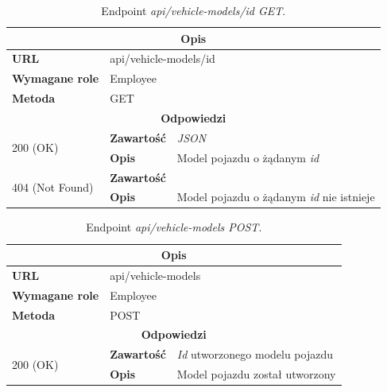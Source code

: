 \documentclass[eng,printmode,openany]{mgr}
\begin{document}
\begin{table}[H]
	\caption{Endpoint \textit{api/vehicle-models/id GET}.}
	\begin{tabularx}{\textwidth}{|l|l|X|}
		\hline
		\multicolumn{3}{|c|}{\textbf{\textbf{Opis}}}
		\\ \hline
		\textbf{URL}                         & \multicolumn{2}{l|}{api/vehicle-models/id}
		\\ \hline
		\textbf{Wymagane role}               & \multicolumn{2}{l|}{Employee}
		\\ \hline
		\textbf{Metoda}                      & \multicolumn{2}{l|}{GET}
		\\ \hline
		\multicolumn{3}{|c|}{\textbf{Odpowiedzi}}
		\\ \hline
		\multirow{2}{*}{200 (OK)} 	        & \textbf{Zawartość}   	& \textit{JSON}
		\\ \cline{2-3}                      & \textbf{Opis}         	& Model pojazdu o żądanym \textit{id}
		\\ \hline
		\multirow{2}{*}{404 (Not Found)} 	& \textbf{Zawartość}     & 
		\\ \cline{2-3}                      & \textbf{Opis}          & Model pojazdu o żądanym \textit{id} nie istnieje
		\\ \hline
	\end{tabularx}
\end{table}

\begin{table}[H]
	\caption{Endpoint \textit{api/vehicle-models POST}.}
	\begin{tabularx}{\textwidth}{|l|l|X|}
		\hline
		\multicolumn{3}{|c|}{\textbf{\textbf{Opis}}}
		\\ \hline
		\textbf{URL}                       & \multicolumn{2}{l|}{api/vehicle-models}
		\\ \hline
		\textbf{Wymagane role}             & \multicolumn{2}{l|}{Employee}
		\\ \hline
		\textbf{Metoda}                    & \multicolumn{2}{l|}{POST}
		\\ \hline
		\multicolumn{3}{|c|}{\textbf{Odpowiedzi}}
		\\ \hline
		\multirow{2}{*}{200 (OK)} 		& \textbf{Zawartość}     & \textit{Id} utworzonego modelu pojazdu
		\\ \cline{2-3}                  & \textbf{Opis}         	& Model pojazdu został utworzony
		\\ \hline
	\end{tabularx}
\end{table}
\end{document}
